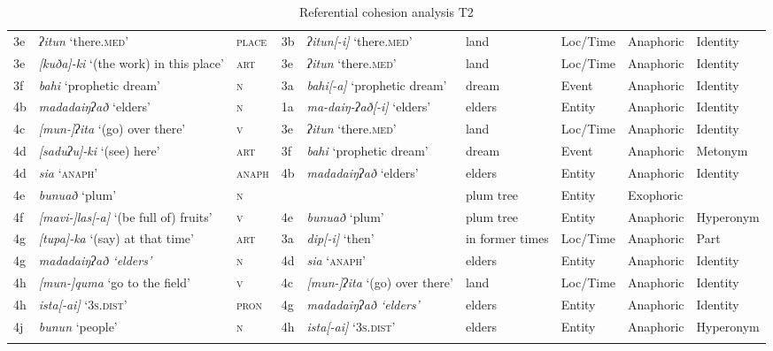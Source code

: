 \documentclass[output=paper
,modfonts
,nonflat]{langsci/langscibook}
\begin{document}
\begin{sidewaystable}
{\begin{tabular}{ll l lll lll}
3e & \textit{ʔitun} ‘there.\textsc{med}’ & \textsc{place} & 3b & \textit{ʔitun[-i]} ‘there.\textsc{med}’ & land & Loc/Time & Anaphoric & Identity\\
3e & \textit{[kuða]-ki} ‘(the work) in this place’ & \textsc{art} & 3e & \textit{ʔitun} ‘there.\textsc{med}’ & land & Loc/Time & Anaphoric & Identity\\
3f & \textit{bahi} ‘prophetic dream’ & \textsc{n} & 3a & \textit{bahi[-a]} ‘prophetic dream’ & dream & Event & Anaphoric & Identity\\
4b & \textit{madadaiŋʔað} ‘elders’ & \textsc{n} & 1a & \textit{ma-daiŋ-ʔað[-i]} ‘elders’ & elders & Entity & Anaphoric & Identity\\
4c & \textit{[mun-]ʔita} ‘(go) over there’ & \textsc{v} & 3e & \textit{ʔitun} ‘there.\textsc{med}’ & land & Loc/Time & Anaphoric & Identity\\
4d & \textit{[saduʔu]-ki} ‘(see) here’ & \textsc{art} & 3f & \textit{bahi} ‘prophetic dream’ & dream & Event & Anaphoric & Metonym\\
4d & \textit{sia} ‘\textsc{anaph}’ & \textsc{anaph} & 4b & \textit{madadaiŋʔað} ‘elders’ & elders & Entity & Anaphoric & Identity\\
4e & \textit{bunuað} ‘plum’ & \textsc{n} &  &  & plum tree & Entity & Exophoric & \\
4f & \textit{[mavi-]las[-a]} ‘(be full of) fruits’ & \textsc{v} & 4e & \textit{bunuað} ‘plum’ & plum tree & Entity & Anaphoric & Hyperonym\\
4g & \textit{[tupa]-ka} ‘(say) at that time’ & \textsc{art} & 3a & \textit{dip[-i]} ‘then’ & in former times & Loc/Time & Anaphoric & Part\\
4g & \textit{madadaiŋʔað ‘elders’} & \textsc{n} & 4d & \textit{sia} ‘\textsc{anaph}’ & elders & Entity & Anaphoric & Identity\\
4h & \textit{[mun-]quma} ‘go to the field’ & \textsc{v} & 4c & \textit{[mun-]ʔita} ‘(go) over there’ & land & Loc/Time & Anaphoric & Identity\\
4h & \textit{ista[-ai]} ‘\textsc{3s.dist}’ & \textsc{pron} & 4g & \textit{madadaiŋʔað ‘elders’} & elders & Entity & Anaphoric & Identity\\
4j & \textit{bunun} ‘people’ & \textsc{n} & 4h & \textit{ista[-ai]} ‘\textsc{3s.dist}’ & elders & Entity & Anaphoric & Hyperonym\\
\lspbottomrule
\end{tabular}
}
\caption{\label{tab:debusser:11}Referential cohesion analysis T2} 
\end{sidewaystable}
\clearpage
\end{document}
